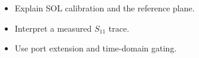 \begin{objectives}
\begin{itemize}[leftmargin=1.4em,itemsep=2pt]
\item Explain SOL calibration and the reference plane.
\item Interpret a measured $S_{11}$ trace.
\item Use port extension and time-domain gating.
\end{itemize}
\end{objectives}
